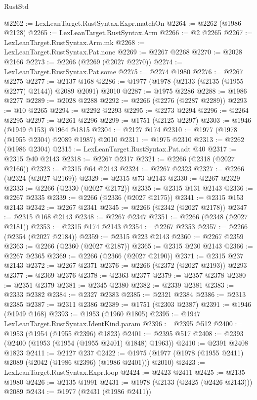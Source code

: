 \begin{lexlean}{RustStd}
\begin{coremodule}
{\begin{coremodule}
{{{{{{{{{{{{{{{{{{{{{{{{{{{{{{{@2262 := LexLeanTarget.RustSyntax.Expr.matchOn
@2264 := @2262 (@1986 @2128)
@2265 := LexLeanTarget.RustSyntax.Arm
@2266 := @2 @2265
@2267 := LexLeanTarget.RustSyntax.Arm.mk
@2268 := LexLeanTarget.RustSyntax.Pat.none
@2269 := @2267 @2268
@2270 := @2028 @2166
@2273 := @2266 (@2269 (@2027 @2270))
@2274 := LexLeanTarget.RustSyntax.Pat.some
@2275 := @2274 @1980
@2276 := @2267 @2275
@2277 := @2137 @168
@2286 := @1977 (@1978 (@2133 (@2135 (@1955 @2277) @2144)) @2089 @2091) @2010
@2287 := @1975 @2286
@2288 := @1986 @2277
@2289 := @2028 @2288
@2292 := @2266 (@2276 (@2287 @2289))
@2293 := @10 @2265
@2294 := @2292 @2293
@2295 := @2273 @2294
@2296 := @2264 @2295
@2297 := @2261 @2296
@2299 := @1751 (@2125 @2297)
@2303 := @1946 (@1949 @153) @1964 @1815
@2304 := @2127 @174
@2310 := @1977 (@1978 (@1955 @2304) @2089 @1987) @2010
@2311 := @1975 @2310
@2313 := @2262 (@1986 @2304)
@2315 := LexLeanTarget.RustSyntax.Pat.adt @40
@2317 := @2315 @40 @2143
@2318 := @2267 @2317
@2321 := @2266 (@2318 (@2027 @2166))
@2323 := @2315 @64 @2143
@2324 := @2267 @2323
@2327 := @2266 (@2324 (@2027 @2169))
@2329 := @2315 @73 @2143
@2330 := @2267 @2329
@2333 := @2266 (@2330 (@2027 @2172))
@2335 := @2315 @131 @2143
@2336 := @2267 @2335
@2339 := @2266 (@2336 (@2027 @2175))
@2341 := @2315 @153 @2143
@2342 := @2267 @2341
@2345 := @2266 (@2342 (@2027 @2178))
@2347 := @2315 @168 @2143
@2348 := @2267 @2347
@2351 := @2266 (@2348 (@2027 @2181))
@2353 := @2315 @174 @2143
@2354 := @2267 @2353
@2357 := @2266 (@2354 (@2027 @2184))
@2359 := @2315 @223 @2143
@2360 := @2267 @2359
@2363 := @2266 (@2360 (@2027 @2187))
@2365 := @2315 @230 @2143
@2366 := @2267 @2365
@2369 := @2266 (@2366 (@2027 @2190))
@2371 := @2315 @237 @2143
@2372 := @2267 @2371
@2376 := @2266 (@2372 (@2027 @2193)) @2293
@2377 := @2369 @2376
@2378 := @2363 @2377
@2379 := @2357 @2378
@2380 := @2351 @2379
@2381 := @2345 @2380
@2382 := @2339 @2381
@2383 := @2333 @2382
@2384 := @2327 @2383
@2385 := @2321 @2384
@2386 := @2313 @2385
@2387 := @2311 @2386
@2389 := @1751 (@2303 @2387)
@2391 := @1946 (@1949 @168)
@2393 := @1953 (@1960 @1805)
@2395 := @1947 LexLeanTarget.RustSyntax.IdentKind.param
@2396 := @2395 @512
@2400 := @1953 (@1954 (@1955 @2396) @1823)
@2401 := @2395 @517
@2408 := @2393 (@2400 (@1953 (@1954 (@1955 @2401) @1848) @1963))
@2410 := @2391 @2408 @1823
@2411 := @2127 @237
@2422 := @1975 (@1977 (@1978 (@1955 @2411) @2089 (@2042 (@1986 @2396) (@1986 @2401))) @2010)
@2423 := LexLeanTarget.RustSyntax.Expr.loop
@2424 := @2423 @2411
@2425 := @2135 @1980
@2426 := @2135 @1991
@2431 := @1978 (@2133 (@2425 (@2426 @2143))) @2089
@2434 := @1977 (@2431 (@1986 @2411))
}}}}}}}}}}}}}}}}}}}}}}}}}}}}}}}
\end{coremodule}}
\end{coremodule}
\end{lexlean}
